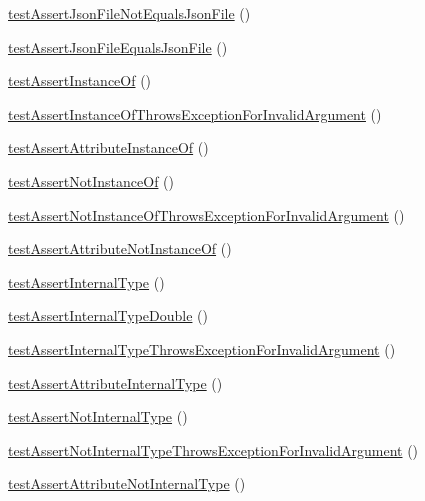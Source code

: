 \begin{DoxyCompactItemize}
\item 
\mbox{\hyperlink{class_framework___assert_test_ab17659879aeb5329900ed756e23274eb}{test\+Assert\+Json\+File\+Not\+Equals\+Json\+File}} ()
\item 
\mbox{\hyperlink{class_framework___assert_test_a4f63341a43fff7dd0e57a83c19e276ed}{test\+Assert\+Json\+File\+Equals\+Json\+File}} ()
\item 
\mbox{\hyperlink{class_framework___assert_test_a28f3f0db2113ba5c1413fc673dccc36d}{test\+Assert\+Instance\+Of}} ()
\item 
\mbox{\hyperlink{class_framework___assert_test_a8d63307812c5edcb70108929f50d558f}{test\+Assert\+Instance\+Of\+Throws\+Exception\+For\+Invalid\+Argument}} ()
\item 
\mbox{\hyperlink{class_framework___assert_test_a0fe6d51b02d8855a948a94716947dec5}{test\+Assert\+Attribute\+Instance\+Of}} ()
\item 
\mbox{\hyperlink{class_framework___assert_test_a1a8a54bfad51fb2651c9a743115401c7}{test\+Assert\+Not\+Instance\+Of}} ()
\item 
\mbox{\hyperlink{class_framework___assert_test_a6b2762dc162f2cb7d0c57bfb02553633}{test\+Assert\+Not\+Instance\+Of\+Throws\+Exception\+For\+Invalid\+Argument}} ()
\item 
\mbox{\hyperlink{class_framework___assert_test_ab1f818e60e567f273e7e73f296c0d1aa}{test\+Assert\+Attribute\+Not\+Instance\+Of}} ()
\item 
\mbox{\hyperlink{class_framework___assert_test_a9f4b0b92b5dfeff83a5ab689049f3040}{test\+Assert\+Internal\+Type}} ()
\item 
\mbox{\hyperlink{class_framework___assert_test_af6e78ee5de46c70458750a4811a2d18d}{test\+Assert\+Internal\+Type\+Double}} ()
\item 
\mbox{\hyperlink{class_framework___assert_test_a6fdf160b763ba50ca7229df591246a3b}{test\+Assert\+Internal\+Type\+Throws\+Exception\+For\+Invalid\+Argument}} ()
\item 
\mbox{\hyperlink{class_framework___assert_test_aaf35b30be440b002100bb39a450106f7}{test\+Assert\+Attribute\+Internal\+Type}} ()
\item 
\mbox{\hyperlink{class_framework___assert_test_adfcd433fce64330cc752268fb9e4ce42}{test\+Assert\+Not\+Internal\+Type}} ()
\item 
\mbox{\hyperlink{class_framework___assert_test_a178f71558daf755bca6e1a114844286e}{test\+Assert\+Not\+Internal\+Type\+Throws\+Exception\+For\+Invalid\+Argument}} ()
\item 
\mbox{\hyperlink{class_framework___assert_test_a1f1bd05abb76b813505116e1a50d2f92}{test\+Assert\+Attribute\+Not\+Internal\+Type}} ()

\end{DoxyCompactItemize}
